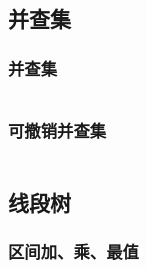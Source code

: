 \documentclass[a4paper, twoside]{article}
\begin{document}
\subsection{并查集}
    \subsubsection{并查集}
    \inputminted{cpp}{../src/数据结构/并查集.cpp}

    \subsubsection{可撤销并查集}
    \inputminted{cpp}{../src/数据结构/可撤销并查集.cpp}

\subsection{线段树}
    \subsubsection{区间加、乘、最值}
    \inputminted{cpp}{../src/数据结构/线段树（区间加、乘、最值）.cpp}






\end{document}
